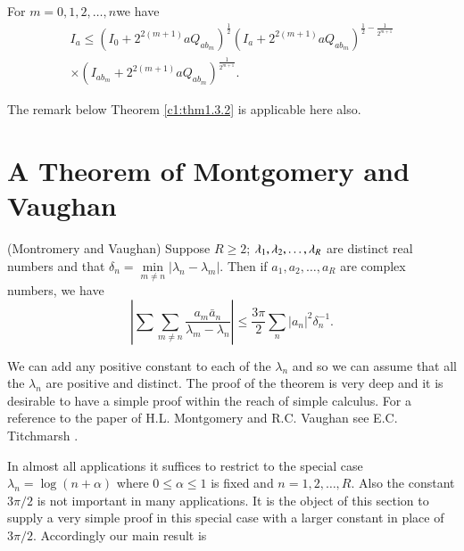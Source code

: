 \medskip
{} For $m = 0,1,2,\ldots, n$\pageoriginale we have
\begin{gather*}
I_a \leq (I_0 + 2^{2(m+1)} aQ_{ab_m})^{\frac{1}{2}} (I_a+2^{2(m+1)} a Q_{ab_m})^{\frac{1}{2} - \frac{1}{2^{m+1}}} \\
\times (I_{ab_m} + 2^{2(m+1)} a Q_{ab_m})^{\frac{1}{2^{m+1}}}. 
\end{gather*}

\begin{remark*}
The remark below Theorem \ref{c1:thm1.3.2} is applicable here also.
\end{remark*}

\section{A Theorem of Montgomery and Vaughan}\label{c1:sec1.4}

\begin{theorem}\label{c1:thm1.4.1}
(Montromery and Vaughan) Suppose $R \geq 2$; $\lambda_1, \lambda_2,
  \ldots,\break\lambda_R$ are distinct real numbers and that $\delta_n =
  \min\limits_{m \neq n} |\lambda_n - \lambda_m|$. Then if $a_1 ,
  a_2,\ldots, a_R$ are complex numbers, we have 
\begin{equation*}
\left| \sum \sum\limits_{m \neq n} \frac{a_m \bar{a}_n}{\lambda_m - \lambda_n} \right| \leq \frac{3\pi}{2} \sum\limits_n |a_n|^2 \delta^{-1}_n. \tag{1.4.1}\label{c1:eq1.4.1}
\end{equation*}
\end{theorem}

\begin{remark*}
We can add any positive constant to each of the $\lambda_n$ and so we can assume that all the $\lambda_n$ are positive and distinct. The proof of the theorem is very deep and it is desirable to have a simple proof within the reach of simple calculus. For a reference to the paper of H.L. Montgomery and R.C. Vaughan see E.C. Titchmarsh \cite{Titchmarsh1}.
\end{remark*}

In almost all applications it suffices to restrict to the special case $\lambda_n = \log (n+\alpha)$ where $0 \leq \alpha \leq 1$ is fixed and $n = 1,2, \ldots, R$. Also the constant $3\pi /2$ is not important in many applications. It is the object of this section to supply a very simple proof in this special case with a larger constant in place of $3\pi /2$. Accordingly our main result is

